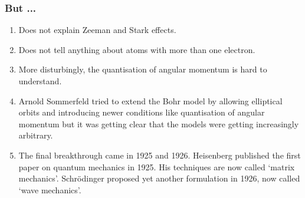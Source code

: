 \documentclass{beamer}
\begin{document}
\begin{frame}
\frametitle{But ...}
\begin{enumerate}
\item Does not explain Zeeman and Stark effects.
\item Does not tell anything about atoms with more than one electron.
\item More disturbingly, the quantisation of angular momentum is hard to 
understand.
\item Arnold Sommerfeld tried to extend the Bohr model by allowing elliptical
orbits and introducing newer conditions like quantisation of angular momentum
but it was getting clear that the models were getting increasingly arbitrary.
\item The final breakthrough came in 1925 and 1926. Heisenberg published the
first paper on quantum mechanics in 1925. His techniques are now called `matrix
mechanics'. Schr\"{o}dinger proposed yet another formulation in 1926, now called
`wave mechanics'.
\end{enumerate}
\end{frame}
\end{document}
